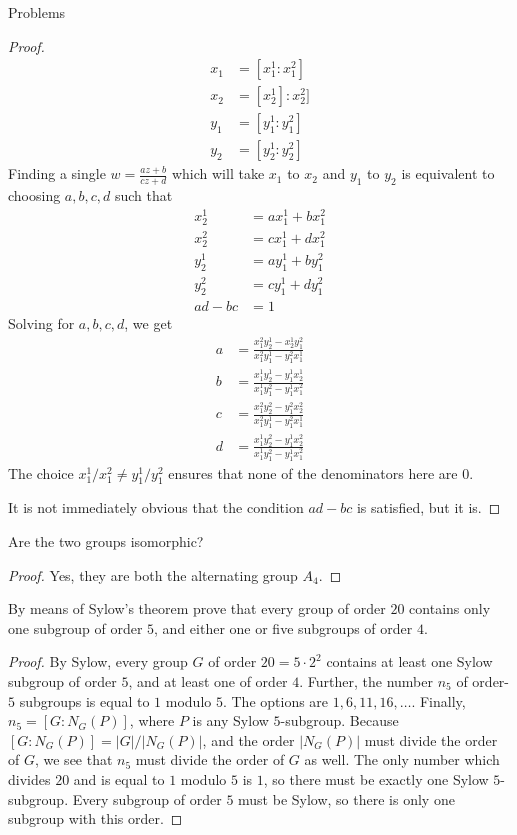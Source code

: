 \documentclass[12pt]{article}
\theoremstyle{definition}
\newenvironment{problem}[2][Problem]{\begin{trivlist}
\item[\hskip \labelsep {\bfseries #1}\hskip \labelsep {\bfseries #2.}]}{\end{trivlist}}
\begin{document}
\begin{section}{Problems}
\begin{problem}{2}
\begin{proof}
		\begin{align*}
			x_1 &= [x_1^1:x_1^2]\\
		x_2 &= [x_2^1]:x_2^2]\\
		y_1 &= [y_1^1:y_1^2]\\
		y_2 &= [y_2^1:y_2^2]
		\end{align*}
		Finding a single $w = \frac{az + b}{cz + d}$ which will take $x_1$ to $x_2$ and $y_1$ to $y_2$ is equivalent to choosing $a,b,c,d$ such that
		\begin{align*}
			x_2^1 &= ax_1^1 + bx_1^2\\
			x_2^2 &= cx_1^1 + dx_1^2\\
			y_2^1 &= ay_1^1 + by_1^2\\
			y_2^2 &= cy_1^1 + dy_1^2\\
			ad - bc &= 1
		\end{align*}
		Solving for $a,b,c,d$, we get
		\begin{align*}
		a &= \frac{x_1^2 y_2^1 - x_2^1 y_1^2}{x_1^2y_1^1 - y_1^2x_1^1}\\
		b &= \frac{x_1^1y_2^1 - y_1^1 x_2^1}{x_1^1y_1^2 - y_1^1 x_1^2}\\
	c &= \frac{ x_1^2y_2^2 - y_1^2 x_2^2}{x_1^2y_1^1 - y_1^2x_1^1}\\
		d &= \frac{x_1^1y_2^2 - y_1^1 x_2^2}{x_1^1 y_1^2 - y_1^1 x_1^2}
		\end{align*}
		The choice $x_1^1/x_1^2 \neq y_1^1/y_1^2$ ensures that none of the denominators here are $0$. 
		\par It is not immediately obvious that the condition $ad -bc $ is satisfied, but it is.
	\end{proof}
	Are the two groups isomorphic?
	\begin{proof}
		Yes, they are both the alternating group $A_4$.
	\end{proof}
\end{problem}
\begin{problem}{3}
	By means of Sylow's theorem prove that every group of order $20$ contains only one subgroup of order $5$, and either one or five subgroups of order $4$.
	\begin{proof}
		By Sylow, every group $G$ of order $20 = 5 \cdot 2^2$ contains at least one Sylow subgroup of order $5$, and at least one of order $4$. Further, the number $n_5$ of order-$5$ subgroups is equal to $1$ modulo $5$. The options are $1, 6, 11, 16, \dots$. Finally, $n_5 = [G : N_G(P)]$, where $P$ is any Sylow $5$-subgroup. Because $[G : N_G(P)] = \lvert G\rvert / \lvert N_G(P) \rvert$, and the order $\lvert N_G(P) \rvert$ must divide the order of $G$, we see that $n_5$ must divide the order of $G$ as well. The only number which divides $20$ and is equal to $1$ modulo $5$ is $1$, so there must be exactly one Sylow $5$-subgroup. Every subgroup of order $5$ must be Sylow, so there is only one subgroup with this order.

\end{proof}
\end{problem}
\end{section}
\end{document}
